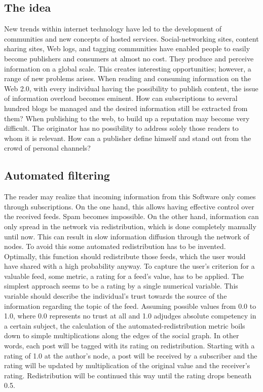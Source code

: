 \documentclass[a4paper]{scrartcl}
\begin{document}
\subsection{The idea}
New trends within internet technology have led to the development of communities and new concepts of hosted services. Social-networking sites, content sharing sites, Web logs, and tagging communities have enabled people to easily become publishers and consumers at almost no cost. They produce and perceive information on a global scale. This creates interesting opportunities; however, a range of new problems arises.
When reading and consuming information on the Web 2.0, with every individual having the possibility to publish content, the issue of information overload becomes eminent. How can subscriptions to several hundred blogs be managed and the desired information still be extracted from them?
When publishing to the web, to build up a reputation may become very difficult. The originator has no possibility to address solely those readers to whom it is relevant. How can a publisher define himself and stand out from the crowd of personal channels?

\subsection{Automated filtering} 

The reader may realize that incoming information from this Software only comes  through subscriptions. On the one hand, this allows having effective control over the received feeds. Spam becomes impossible. On the other hand, information can only spread in the network via redistribution, which is done completely manually until now. This can result in slow information diffusion through the network of nodes.
To avoid this some automated redistribution has to be invented. Optimally, this function should redistribute those feeds, which the user would have shared with a high probability anyway. To capture the user's criterion for a valuable feed, some metric, a rating for a feed's value, has to be applied. The simplest approach seems to be a rating by a single numerical variable. This variable should describe the individual's trust towards the source of the information regarding the topic of the feed. Assuming possible values from 0.0 to 1.0, where 0.0 represents no trust at all and 1.0 adjudges absolute competency in a certain subject, the calculation of the automated-redistribution metric boils down to simple multiplications along the edges of the social graph. In other words, each post will be tagged with its rating on redistribution. Starting with a rating of 1.0 at the author's node, a post will be received by a subscriber and the rating will be updated by multiplication of the original value and the receiver's rating. Redistribution will be continued this way until the rating drops beneath 0.5.
\end{document}
